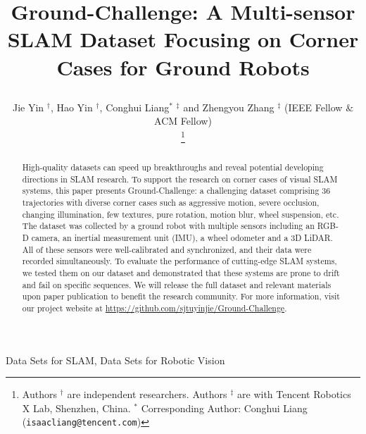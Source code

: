\documentclass[conference]{IEEEtran}
\begin{document}
\title{	Ground-Challenge: A Multi-sensor SLAM Dataset	Focusing on Corner Cases for Ground Robots
	

\author{Jie Yin $^{\dag}$, Hao Yin $^{\dag}$, Conghui Liang$^{*}$ $^{\ddag}$ and Zhengyou Zhang $^{\ddag}$ (IEEE Fellow $\&$ ACM Fellow)

\thanks{ Authors $^{\dag}$ are independent researchers. Authors $^{\ddag}$  are with Tencent Robotics X Lab, Shenzhen, China.
$^*$ Corresponding Author: Conghui Liang ({\tt\small isaacliang@tencent.com})}}

}





\maketitle

\begin{abstract}
High-quality datasets can speed up breakthroughs and reveal potential developing directions in SLAM research.
To support the research on corner cases of visual SLAM systems,
this paper presents Ground-Challenge: a challenging dataset comprising 36 trajectories with diverse corner cases such as aggressive motion, severe occlusion, changing illumination, few textures, pure rotation, motion blur, wheel suspension, etc. The dataset was 
collected by a ground robot with multiple sensors including an RGB-D camera, an inertial measurement unit (IMU), a wheel odometer and a 3D LiDAR. All of these sensors were well-calibrated and synchronized, and their data were recorded simultaneously.
To evaluate the performance of cutting-edge SLAM systems, we tested them on our dataset and demonstrated that these systems are prone to drift and fail on specific sequences.
We will release the full dataset and relevant materials upon paper publication to benefit the research community. For more information, visit our project website at \href{https://github.com/sjtuyinjie/Ground-Challenge}{https://github.com/sjtuyinjie/Ground-Challenge}.
\end{abstract}

\begin{IEEEkeywords}
Data Sets for SLAM, Data Sets for Robotic Vision
\end{IEEEkeywords}
\end{document}

